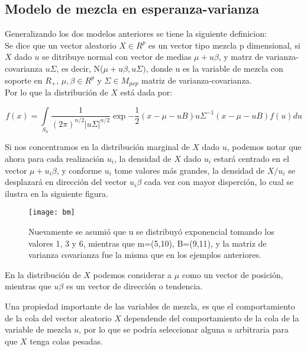 \documentclass[11pt]{book}
\begin{document}
\pagebreak
\subsection*{Modelo de mezcla en esperanza-varianza}

Generalizando los dos modelos anteriores se tiene la siguiente definicion:\\

Se dice que un vector aleatorio $X\in R^{p}$ es un vector tipo mezcla p dimensional, si $X$ dado $u$ se ditribuye normal con vector de medias $\mu +u\beta$, y matrz de varianza-covarianza $u\Sigma$, es decir, N($\mu + u\beta, u\Sigma)$, donde u es la variable de mezcla con soporte en $R_{+}$, $\mu, \beta \in R^{p}$ y $\Sigma\in M_{pxp}$ matriz de varianza-covarianza.\\


Por lo que la distribución de $X$ está dada por:

\begin{equation}
f(x)=\underset{S_{u}}{\int}\dfrac{1}{(2\pi)^{n/2}|u\Sigma|^{n/2}}\exp{-\dfrac{1}{2}(x-\mu-uB)\acute{}u\Sigma^{-1}(x-\mu-uB)}f(u)du 
\end{equation}

Si nos concentramos en la distribución marginal de $X$ dado $u$, podemos notar que ahora para cada realización  $u_{i}$, la densidad de $X$ dado $u_{i}$ estará centrado en el vector $\mu + u_{i}\beta$, y conforme $u_{i}$ tome valores más grandes, la densidad de $X/u_{i}$ se desplazará en dirección del vector $u_{i}\beta$ cada vez con mayor disperción, lo cual se ilustra en la siguiente figura.\\
\begin{figure}[h]
\centering
\texttt{[image: bm]}
\caption{Nuevamente se asumió que u se distribuyó exponencial tomando los valores 1, 3 y 6, mientras que m=(5,10), B=(9,11), y la matriz de varianza covarianza fue la misma que en los ejemplos anteriores.}
\end{figure}



En la distribución de $X$ podemos considerar a $\mu$ como un vector de posición, mientras que $u\beta$ es un vector de dirección o tendencia.


Una propiedad importante de las variables de mezcla, es que el comportamiento de la cola del vector aleatorio $X$ dependende del comportamiento de la cola de la variable de mezcla $u$, por lo que se podría seleccionar alguna $u$ arbitraria para que $X$ tenga colas pesadas.
\end{document}
